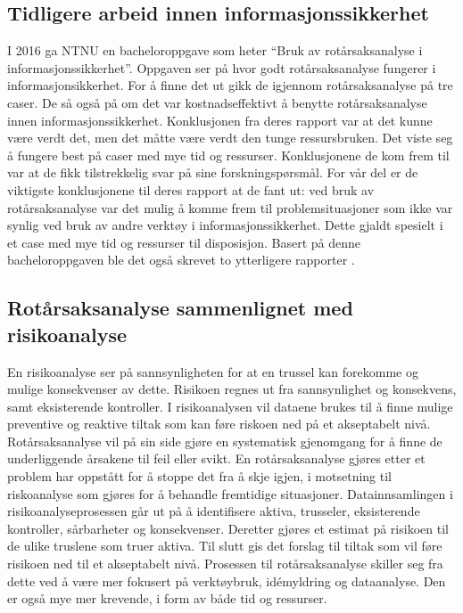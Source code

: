 \subsection{Tidligere arbeid innen informasjonssikkerhet}
I 2016 ga NTNU en bacheloroppgave som heter ``Bruk av rotårsaksanalyse i informasjonssikkerhet''\cite{RCARapport}. Oppgaven ser på hvor godt rotårsaksanalyse fungerer i informasjonsikkerhet. For å finne det ut gikk de igjennom rotårsaksanalyse på tre caser. De så også på om det var kostnadseffektivt å benytte rotårsaksanalyse innen informasjonssikkerhet. Konklusjonen fra deres rapport var at det kunne være verdt det, men det måtte være verdt den tunge ressursbruken. Det viste seg å fungere best på caser med mye tid og ressurser. Konklusjonene de kom frem til var at de fikk tilstrekkelig svar på sine forskningspørsmål. For vår del er de viktigste konklusjonene til deres rapport\cite{RCARapport} at de fant ut: ved bruk av rotårsaksanalyse var det mulig å komme frem til problemsituasjoner som ikke var synlig ved bruk av andre verktøy i informasjonssikkerhet. Dette gjaldt spesielt i et case med mye tid og ressurser til disposisjon. Basert på denne bacheloroppgaven ble det også skrevet to ytterligere rapporter \cite{Hellesen:1} \cite{Wangen:1}. 

\subsection{Rotårsaksanalyse sammenlignet med risikoanalyse}
En risikoanalyse ser på sannsynligheten for at en trussel kan forekomme og mulige konsekvenser av dette. Risikoen regnes ut fra sannsynlighet og konsekvens, samt eksisterende kontroller. I risikoanalysen vil dataene brukes til å finne mulige preventive og reaktive tiltak som kan føre riskoen ned på et akseptabelt nivå. Rotårsaksanalyse vil på sin side gjøre en systematisk gjenomgang for å finne de underliggende årsakene til feil eller svikt. En rotårsaksanalyse gjøres etter et problem har oppstått for å stoppe det fra å skje igjen, i motsetning til riskoanalyse som gjøres for å behandle fremtidige situasjoner. Datainnsamlingen i risikoanalyseprosessen går ut på å identifisere aktiva, trusseler, eksisterende kontroller, sårbarheter og konsekvenser. Deretter gjøres et estimat på risikoen til de ulike truslene som truer aktiva. Til slutt gis det forslag til tiltak som vil føre risikoen ned til et akseptabelt nivå. Prosessen til rotårsaksanalyse skiller seg fra dette ved å være mer fokusert på verktøybruk, idémyldring og dataanalyse. Den er også mye mer krevende, i form av både tid og ressurser. 